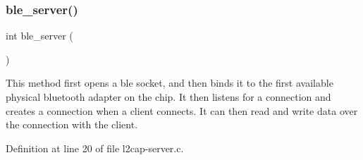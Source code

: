 \subsubsection{\texorpdfstring{ble\+\_\+server()}{ble\_server()}}
{\footnotesize\ttfamily int ble\+\_\+server (\begin{DoxyParamCaption}{ }\end{DoxyParamCaption})}

This method first opens a ble socket, and then binds it to the first available physical bluetooth adapter on the chip. It then listens for a connection and creates a connection when a client connects. It can then read and write data over the connection with the client. 

Definition at line 20 of file l2cap-\/server.\+c.

